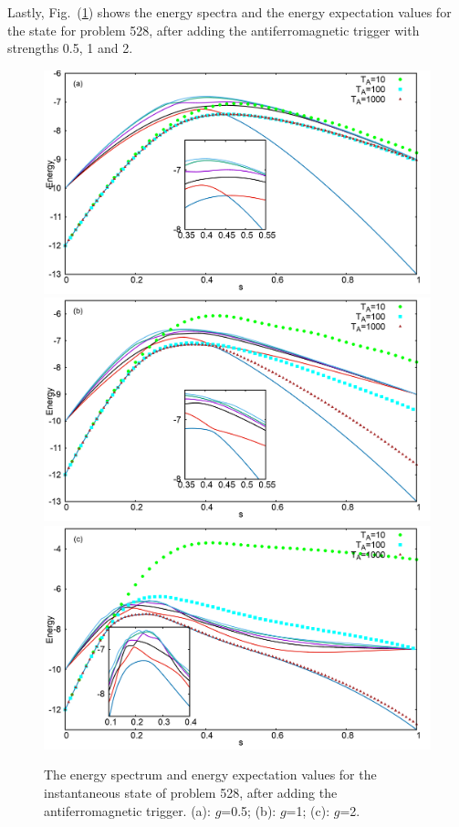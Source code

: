 \documentclass[../main.tex]{subfiles}
\begin{document}
Lastly, Fig.~(\ref{fig:a7}) shows the energy spectra and the energy expectation values for the state for problem 528, after adding the antiferromagnetic trigger with strengths 0.5, 1 and 2. 


\begin{figure}
\centering 
\includegraphics[scale=0.24]{528_s12_A_g0.png}
\includegraphics[scale=0.24]{528_s12_A_g1.png}
\includegraphics[scale=0.24]{528_s12_A_g2.png}
\caption{The energy spectrum and energy expectation values for the instantaneous state of problem 528, after adding the antiferromagnetic trigger. (a): $g$=0.5; (b): $g$=1; (c): $g$=2.}
\label{fig:a7}
\end{figure}
\end{document}
